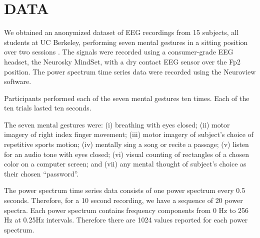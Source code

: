 \section{\uppercase{Data}}
\label{sec:data}


\noindent We obtained an anonymized dataset of EEG recordings from 15 subjects, all students at UC Berkeley, performing seven mental gestures in a sitting position over two sessions \cite{adams_i_2013}. The signals were recorded using a consumer-grade EEG headset, the Neurosky MindSet, with a dry contact EEG sensor over the Fp2 position. The power spectrum time series data were recorded using the Neuroview software.


Participants performed each of the seven mental gestures ten times. Each of the ten trials lasted ten seconds.

The seven mental gestures were: (i) breathing with eyes closed; (ii) motor imagery of right index finger movement; (iii) motor imagery of subject's choice of repetitive sports motion; (iv) mentally sing a song or recite a passage; (v) listen for an audio tone with eyes closed; (vi) visual counting of rectangles of a chosen color on a computer screen; and (vii) any mental thought of subject's choice as their chosen ``password''.


The power spectrum time series data consists of one power spectrum every 0.5 seconds. Therefore, for a 10 second recording, we have a sequence of 20 power spectra. Each power spectrum contains frequency components from 0 Hz to 256 Hz at 0.25Hz intervals. Therefore there are 1024 values reported for each power spectrum.


